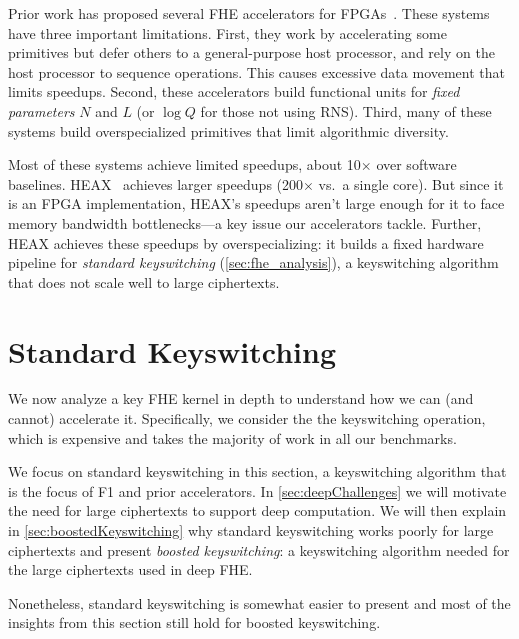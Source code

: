 Prior work has proposed several FHE accelerators for
FPGAs~\cite{cousins:hpec14:fpga-he,cousins:tetc17:fpga-he,doroz:tc15:accelerating-fhe,roy:hpca19:fpga-he,migliore:tecs17:he-karatsuba,riazi:asplos20:heax,turan:tc20:heaws,mert:tvlsi20:bfv-accel}.
These systems have three important limitations. First, they work by
accelerating some primitives but defer others to a general-purpose host
processor, and rely on the host processor to sequence operations. This causes
excessive data movement that limits speedups. Second, these accelerators build
functional units for \emph{fixed parameters} $N$ and $L$ (or $\log Q$ for those
not using RNS). Third, many of these systems build overspecialized primitives
that limit algorithmic diversity.

Most of these systems achieve limited speedups, about 10$\times$ over software
baselines. HEAX~\cite{riazi:asplos20:heax} achieves larger speedups
(200$\times$ vs.\ a single core). But since it is an FPGA implementation,
HEAX's speedups aren't large enough for it to face memory bandwidth
bottlenecks---a key issue our accelerators tackle. Further, HEAX achieves these
speedups by overspecializing: it builds a fixed hardware pipeline for
\emph{standard keyswitching} (\autoref{sec:fhe_analysis}), a keyswitching
algorithm that does not scale well to large ciphertexts.

\section{Standard Keyswitching}
\label{sec:fhe_analysis}

We now analyze a key FHE kernel in depth to understand how we can (and cannot)
accelerate it. Specifically, we consider the the keyswitching
operation, which is expensive and takes the majority of work in all our
benchmarks.

We focus on standard keyswitching in this section, a keyswitching algorithm
that is the focus of F1 and prior accelerators. In \autoref{sec:deepChallenges}
we will motivate the need for large ciphertexts to support deep computation. We
will then explain in \autoref{sec:boostedKeyswitching} why standard
keyswitching works poorly for large ciphertexts and present \emph{boosted
keyswitching}: a keyswitching algorithm needed for the large ciphertexts used
in deep FHE.

Nonetheless, standard keyswitching is somewhat easier to present and most of
the insights from this section still hold for boosted keyswitching.

